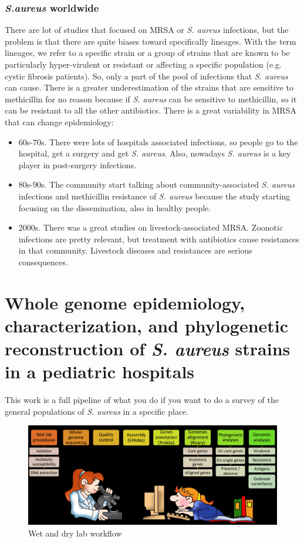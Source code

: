 \subsubsection{\emph{S.aureus} worldwide}
There are lot of studies that focused on MRSA or \emph{S. aureus} infections, but the problem is that there are quite biases toward specifically lineages. With the term lineages, we refer to a specific strain or a group of strains that are known to be particularly hyper-virulent or resistant or affecting a specific population (e.g. cystic fibrosis patients). So, only a part of the pool of infections that \emph{S. aureus} can cause. There is a greater underestimation of the strains that are sensitive to methicillin for no reason because if \emph{S. aureus} can be sensitive to methicillin, so it can be resistant to all the other antibiotics. 
There is a great variability in MRSA that can change epidemiology:
\begin{itemize}
    \item $60$s-$70$s. There were lots of hospitals associated infections, so people go to the hospital, get a surgery and get \emph{S. aureus}. Also, nowadays \emph{S. aureus} is a key player in post-surgery infections. 
    \item $80$s-$90$s. The community start talking about community-associated \emph{S. aureus} infections and methicillin resistance of \emph{S. aureus} because the study starting focusing on the dissemination, also in healthy people.
    \item $2000$s. There was a great studies on livestock-associated MRSA. Zoonotic infections are pretty relevant, but treatment with antibiotics cause resistances in that community. Livestock diseases and resistances are serious consequences.  
\end{itemize}

\section{Whole genome epidemiology, characterization, and phylogenetic reconstruction of \emph{S. aureus} strains in a pediatric hospitals}

This work is a full pipeline of what you do if you want to do a survey of the general populations of \emph{S. aureus} in a specific place. 

\begin{figure}[h]
\centering
\caption{}
\includegraphics[width=1.0\textwidth]{Workflow.png}
\caption{Wet and dry lab workflow}
\end{figure}

